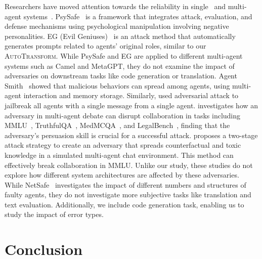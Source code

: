 \documentclass{article}
\theoremstyle{plain}
\theoremstyle{definition}
\theoremstyle{remark}
\begin{document}
Researchers have moved attention towards the reliability in single~\cite{yu2024llm, yu2025survey, perez2022red, tan2021reliability, wang2025comprehensive, chen2025survey} and multi-agent systems~\cite{mao2025agentsafe, zhou2025corba, wang2025g}.
PsySafe~\cite{zhang2024psysafe} is a framework that integrates attack, evaluation, and defense mechanisms using psychological manipulation involving negative personalities.
EG (Evil Geniuses)~\cite{tian2023evil} is an attack method that automatically generates prompts related to agents' original roles, similar to our \textsc{AutoTransform}.
While PsySafe and EG are applied to different multi-agent systems such as Camel and MetaGPT, they do not examine the impact of adversaries on downstream tasks like code generation or translation.
Agent Smith~\cite{gu2024agent} showed that malicious behaviors can spread among agents, using multi-agent interaction and memory storage.
Similarly, \citet{yu2024infecting} used adversarial attack to jailbreak all agents with a single message from a single agent.
\citet{amayuelas2024multiagent} investigates how an adversary in multi-agent debate can disrupt collaboration in tasks including MMLU~\cite{hendrycksmeasuring}, TruthfulQA~\cite{lin2022truthfulqa}, MedMCQA~\cite{pal2022medmcqa}, and LegalBench~\cite{guha2024legalbench}, finding that the adversary's persuasion skill is crucial for a successful attack.
\citet{ju2024flooding} proposes a two-stage attack strategy to create an adversary that spreads counterfactual and toxic knowledge in a simulated multi-agent chat environment.
This method can effectively break collaboration in MMLU.
Unlike our study, these studies do not explore how different system architectures are affected by these adversaries.
While NetSafe~\cite{yu2024netsafe} investigates the impact of different numbers and structures of faulty agents, they do not investigate more subjective tasks like translation and text evaluation.
Additionally, we include code generation task, enabling us to study the impact of error types.
\section{Conclusion}
\end{document}
